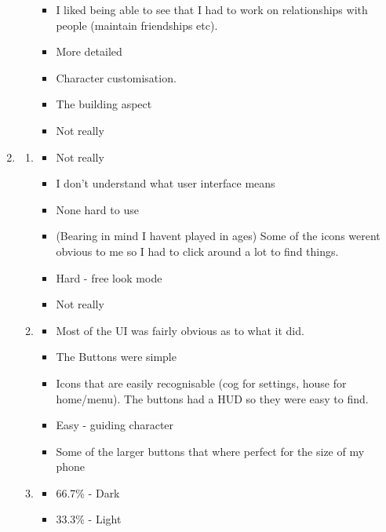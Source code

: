 \begin{enumerate}
\begin{enumerate}
\begin{itemize}
            \item I liked being able to see that I had to work on relationships with people (maintain friendships etc).
            \item More detailed
            \item Character customisation.
            \item The building aspect
            \item Not really
        \end{itemize}
    \end{enumerate}
    \item
    \begin{enumerate}
        \item
        \begin{itemize}
            \item Not really
            \item I don’t understand what user interface means
            \item None hard to use
            \item (Bearing in mind I haven\textquotesingle t played in ages) Some of the icons weren\textquotesingle t obvious to me so I had to click around a lot to find things.
            \item Hard - free look mode
            \item Not really
        \end{itemize}
        \item 
        \begin{itemize}
            \item Most of the UI was fairly obvious as to what it did.
            \item The Buttons were simple
            \item Icons that are easily recognisable (cog for settings, house for home/menu). The buttons had a HUD so they were easy to find.
            \item Easy - guiding character
            \item Some of the larger buttons that where perfect for the size of my phone
        \end{itemize}
        \item
        \begin{itemize}
            \item 66.7\% - Dark
            \item33.3\% - Light
        \end{itemize}   
    \end{enumerate}
\end{enumerate}

